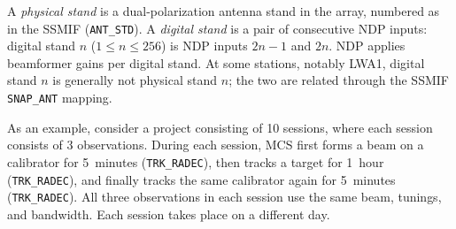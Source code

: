 A \textit{physical stand} is a dual-polarization antenna stand in the array, numbered as in the SSMIF (\texttt{ANT\_STD}).  A \textit{digital stand} is a pair of consecutive NDP inputs: digital stand $n$ ($1 \le n \le 256$) is NDP inputs $2n-1$ and $2n$.  NDP applies beamformer gains per digital stand.  At some stations, notably LWA1, digital stand $n$ is generally not physical stand $n$; the two are related through the SSMIF \texttt{SNAP\_ANT} mapping.

As an example, consider a project consisting of 10 sessions, where each session consists of 3 observations.  During each session, MCS first forms a beam on a calibrator for 5~minutes (\texttt{TRK\_RADEC}), then tracks a target for 1~hour (\texttt{TRK\_RADEC}), and finally tracks the same calibrator again for 5~minutes (\texttt{TRK\_RADEC}).  All three observations in each session use the same beam, tunings, and bandwidth.  Each session takes place on a different day.
